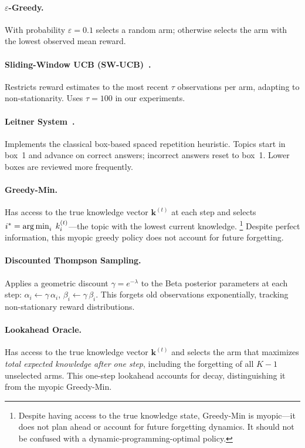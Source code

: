 \paragraph{$\varepsilon$-Greedy.}
With probability $\varepsilon = 0.1$ selects a random arm; otherwise selects the arm with the lowest observed mean reward.

\paragraph{Sliding-Window UCB (SW-UCB)~\citep{garivier2011upper}.}
Restricts reward estimates to the most recent $\tau$ observations per arm, adapting to non-stationarity.
Uses $\tau = 100$ in our experiments.

\paragraph{Leitner System~\citep{leitner1972so}.}
Implements the classical box-based spaced repetition heuristic.
Topics start in box~1 and advance on correct answers; incorrect answers reset to box~1.
Lower boxes are reviewed more frequently.

\paragraph{Greedy-Min.}
Has access to the true knowledge vector $\mathbf{k}^{(t)}$ at each step and selects $i^* = \operatorname*{arg\,min}_i \; k_i^{(t)}$---the topic with the lowest current knowledge.%
\footnote{Despite having access to the true knowledge state, Greedy-Min is myopic---it does not plan ahead or account for future forgetting dynamics. It should not be confused with a dynamic-programming-optimal policy.}
Despite perfect information, this myopic greedy policy does not account for future forgetting.

\paragraph{Discounted Thompson Sampling.}
Applies a geometric discount $\gamma = e^{-\lambda}$ to the Beta posterior parameters at each step: $\alpha_i \leftarrow \gamma\,\alpha_i$, $\beta_i \leftarrow \gamma\,\beta_i$.
This forgets old observations exponentially, tracking non-stationary reward distributions.

\paragraph{Lookahead Oracle.}
Has access to the true knowledge vector $\mathbf{k}^{(t)}$ and selects the arm that maximizes \emph{total expected knowledge after one step}, including the forgetting of all $K{-}1$ unselected arms.
This one-step lookahead accounts for decay, distinguishing it from the myopic Greedy-Min.

